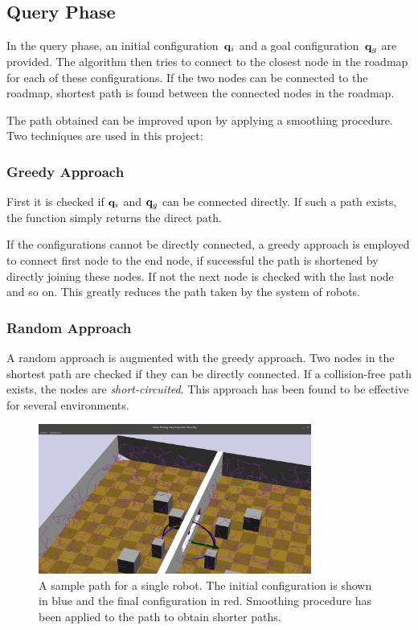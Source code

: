 \documentclass[12pt,a4paper, onecolumn]{IEEEtran}
\begin{document}
\subsection{Query Phase}
In the query phase, an initial configuration~$\mathbf{q}_i$ and a goal configuration~$\mathbf{q}_g$
are provided. The algorithm then tries to connect to the closest node in the roadmap for
each of these configurations. If the two nodes can be connected to the roadmap, shortest
path is found between the connected nodes in the roadmap. 

The path obtained can be improved upon by applying a smoothing procedure. Two techniques
are used in this project:
\subsubsection{Greedy Approach}
First it is checked if $\mathbf{q}_i$ and $\mathbf{q}_g$ can be connected directly. If such a path
exists, the function simply returns the direct path.

If the configurations cannot be directly connected, a greedy approach is employed to
connect first node to the end node, if successful the path is shortened by directly
joining these nodes. If not the next node is checked with the last node and so on. This
greatly reduces the path taken by the system of robots.

\subsubsection{Random Approach}
A random approach is augmented with the greedy approach. Two nodes in the shortest path are checked
if they can be directly connected. If a collision-free path exists, the nodes are {\em
short-circuited}. This approach has been found to be effective for several environments.

\begin{figure}[htbp]
  \centering
  \includegraphics[width=0.8\textwidth]{path_single.png}
  \caption{A sample path for a single robot. The initial configuration is shown in blue
  and the final configuration in red. Smoothing procedure has been applied to the path to
obtain shorter paths.}
  \label{fig:pathS}
\end{figure}




\end{document}
